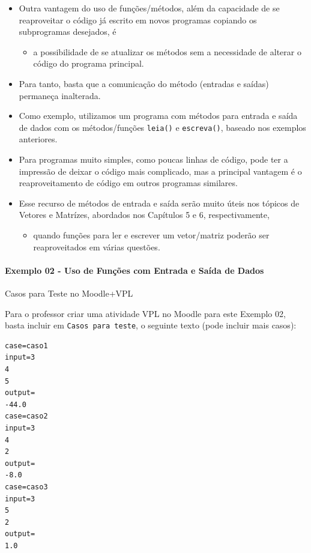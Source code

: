 \documentclass[12pt,a4paper]{article}
\providecommand{\tightlist}{%
      \setlength{\itemsep}{0pt}\setlength{\parskip}{0pt}}
\begin{document}
    \begin{itemize}
\item
  Outra vantagem do uso de funções/métodos, além da capacidade de se
  reaproveitar o código já escrito em novos programas copiando os
  subprogramas desejados, é

  \begin{itemize}
  \tightlist
  \item
    a possibilidade de se atualizar os métodos sem a necessidade de
    alterar o código do programa principal.
  \end{itemize}
\item
  Para tanto, basta que a comunicação do método (entradas e saídas)
  permaneça inalterada.
\item
  Como exemplo, utilizamos um programa com métodos para entrada e saída
  de dados com os métodos/funções \texttt{leia()} e \texttt{escreva()},
  baseado nos exemplos anteriores.
\item
  Para programas muito simples, como poucas linhas de código, pode ter a
  impressão de deixar o código mais complicado, mas a principal vantagem
  é o reaproveitamento de código em outros programas similares.
\item
  Esse recurso de métodos de entrada e saída serão muito úteis nos
  tópicos de Vetores e Matrízes, abordados nos Capítulos 5 e 6,
  respectivamente,

  \begin{itemize}
  \tightlist
  \item
    quando funções para ler e escrever um vetor/matriz poderão ser
    reaproveitados em várias questões.
  \end{itemize}
\end{itemize}

    \hypertarget{exemplo-02---uso-de-funuxe7uxf5es-com-entrada-e-sauxedda-de-dados}{%
\paragraph{Exemplo 02 - Uso de Funções com Entrada e Saída de
Dados}\label{exemplo-02---uso-de-funuxe7uxf5es-com-entrada-e-sauxedda-de-dados}}

    Casos para Teste no Moodle+VPL

Para o professor criar uma atividade VPL no Moodle para este Exemplo 02,
basta incluir em \texttt{Casos\ para\ teste}, o seguinte texto (pode
incluir mais casos):

\begin{verbatim}
case=caso1
input=3
4
5
output= 
-44.0
case=caso2
input=3
4
2
output= 
-8.0
case=caso3
input=3
5
2
output= 
1.0
\end{verbatim}
\end{document}
